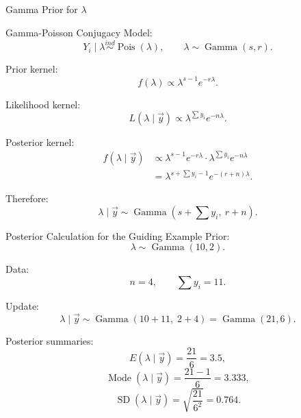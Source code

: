 \documentclass[aspectratio=43,11pt]{beamer}
\newcommand{\Pois}{\operatorname{Pois}}
\newcommand{\GammaDist}{\operatorname{Gamma}}
\begin{document}
\begin{frame}{Gamma Prior for $\lambda$}
\begin{center}
{}
\end{center}
\end{frame}

\begin{frame}{Gamma-Poisson Conjugacy}
Model:
\[
  Y_i\mid\lambda\stackrel{ind}{\sim}\Pois(\lambda),
  \qquad
  \lambda\sim\GammaDist(s,r).
\]

Prior kernel:
\[
  f(\lambda)\propto \lambda^{s-1}e^{-r\lambda}.
\]

Likelihood kernel:
\[
  L(\lambda\mid\vec y)\propto \lambda^{\sum y_i}e^{-n\lambda}.
\]

Posterior kernel:
\[
\begin{aligned}
  f(\lambda\mid\vec y)&\propto
  \lambda^{s-1}e^{-r\lambda}\cdot\lambda^{\sum y_i}e^{-n\lambda} \\
  &=\lambda^{s+\sum y_i-1}e^{-(r+n)\lambda}.
\end{aligned}
\]

Therefore:
\[
  \boxed{\lambda\mid\vec y\sim\GammaDist\left(s+\sum y_i,\ r+n\right)}.
\]
\end{frame}

\begin{frame}{Posterior Calculation for the Guiding Example}
Prior:
\[
  \lambda\sim\GammaDist(10,2).
\]

Data:
\[
  n=4,\qquad \sum y_i=11.
\]

Update:
\[
  \lambda\mid\vec y\sim\GammaDist(10+11,\;2+4)=\GammaDist(21,6).
\]

Posterior summaries:
\[
  E(\lambda\mid\vec y)=\frac{21}{6}=3.5,
\]
\[
  \operatorname{Mode}(\lambda\mid\vec y)=\frac{21-1}{6}=3.333,
\]
\[
  \operatorname{SD}(\lambda\mid\vec y)=\sqrt{\frac{21}{6^2}}=0.764.
\]
\end{frame}
\end{document}

